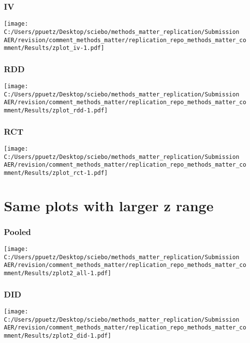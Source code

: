\documentclass[
]{article}
\begin{document}
\hypertarget{iv}{%
\subsubsection{IV}\label{iv}}

\texttt{[image: C:/Users/ppuetz/Desktop/sciebo/methods\_matter\_replication/Submission AER/revision/comment\_methods\_matter/replication\_repo\_methods\_matter\_comment/Results/zplot\_iv-1.pdf]}

\hypertarget{rdd}{%
\subsubsection{RDD}\label{rdd}}

\texttt{[image: C:/Users/ppuetz/Desktop/sciebo/methods\_matter\_replication/Submission AER/revision/comment\_methods\_matter/replication\_repo\_methods\_matter\_comment/Results/zplot\_rdd-1.pdf]}

\hypertarget{rct}{%
\subsubsection{RCT}\label{rct}}

\texttt{[image: C:/Users/ppuetz/Desktop/sciebo/methods\_matter\_replication/Submission AER/revision/comment\_methods\_matter/replication\_repo\_methods\_matter\_comment/Results/zplot\_rct-1.pdf]}

\hypertarget{same-plots-with-larger-z-range}{%
\section{Same plots with larger z
range}\label{same-plots-with-larger-z-range}}

\hypertarget{pooled-1}{%
\subsubsection{Pooled}\label{pooled-1}}

\texttt{[image: C:/Users/ppuetz/Desktop/sciebo/methods\_matter\_replication/Submission AER/revision/comment\_methods\_matter/replication\_repo\_methods\_matter\_comment/Results/zplot2\_all-1.pdf]}

\hypertarget{did-1}{%
\subsubsection{DID}\label{did-1}}

\texttt{[image: C:/Users/ppuetz/Desktop/sciebo/methods\_matter\_replication/Submission AER/revision/comment\_methods\_matter/replication\_repo\_methods\_matter\_comment/Results/zplot2\_did-1.pdf]}
\end{document}
